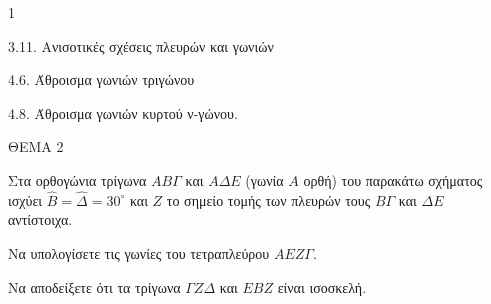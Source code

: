 \begin{ylh}{1}
    \item 3.11. Ανισοτικές σχέσεις πλευρών και γωνιών
    \item 4.6. Άθροισμα γωνιών τριγώνου
    \item 4.8. Άθροισμα γωνιών κυρτού ν-γώνου.
\end{ylh}

ΘΕΜΑ 2

Στα ορθογώνια τρίγωνα $AB\Gamma$ και $A\Delta E$ (γωνία $A$ ορθή) του παρακάτω σχήματος ισχύει $\widehat{B} = \widehat{\Delta} = 30^{\circ}$ και $Z$ το σημείο τομής των πλευρών τους $B\Gamma$ και $\Delta E$ αντίστοιχα.

\begin{alist}
\item Να υπολογίσετε τις γωνίες του τετραπλεύρου $AEZ\Gamma$. 
\item Να αποδείξετε ότι τα τρίγωνα $\Gamma Z\Delta$ και $EBZ$ είναι ισοσκελή. 

\begin{center}
\end{center}
\end{alist}
